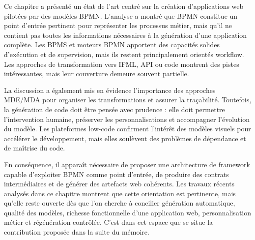 
Ce chapitre a présenté un état de l'art centré sur la création
d'applications web pilotées par des modèles BPMN. L'analyse a montré que
BPMN constitue un point d'entrée pertinent pour représenter les
processus métier, mais qu'il ne contient pas toutes les informations
nécessaires à la génération d'une application complète. Les BPMS et
moteurs BPMN apportent des capacités solides d'exécution et de
supervision, mais ils restent principalement orientés workflow. Les
approches de transformation vers IFML, API ou code montrent des pistes
intéressantes, mais leur couverture demeure souvent partielle.

La discussion a également mis en évidence l'importance des approches
MDE/MDA pour organiser les transformations et assurer la traçabilité.
Toutefois, la génération de code doit être pensée avec prudence : elle
doit permettre l'intervention humaine, préserver les personnalisations
et accompagner l'évolution du modèle. Les plateformes low-code
confirment l'intérêt des modèles visuels pour accélérer le
développement, mais elles soulèvent des problèmes de dépendance et de
maîtrise du code.

En conséquence, il apparaît nécessaire de proposer une architecture de
framework capable d'exploiter BPMN comme point d'entrée, de produire des
contrats intermédiaires et de générer des artefacts web cohérents. Les
travaux récents analysés dans ce chapitre montrent que cette orientation
est pertinente, mais qu'elle reste ouverte dès que l'on cherche à
concilier génération automatique, qualité des modèles, richesse
fonctionnelle d'une application web, personnalisation métier et
régénération contrôlée. C'est dans cet espace que se situe la
contribution proposée dans la suite du mémoire.

